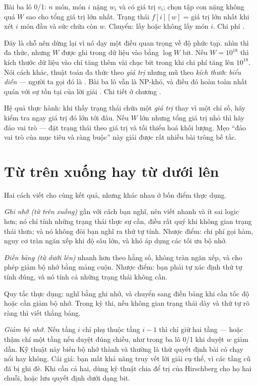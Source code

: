\documentclass[../../algorithm.tex]{subfiles}
\begin{document}
Bài ba lô 0/1: \(n\) món, món \(i\) nặng \(w_i\) và có giá trị \(v_i\); chọn tập con nặng không quá \(W\) sao cho tổng giá trị lớn nhất. Trạng thái \(f[i][w]\) = giá trị lớn nhất khi xét \(i\) món đầu và sức chứa còn \(w\). Chuyển: lấy hoặc không lấy món \(i\). Chi phí .

Đây là chỗ nên dừng lại vì nó dạy một điều quan trọng về độ phức tạp.  nhìn thì đa thức, nhưng \(W\) được ghi trong dữ liệu vào bằng \(\log W\) bit. Nếu \(W = 10^{18}\) thì kích thước dữ liệu vào chỉ tăng thêm vài chục bit trong khi chi phí tăng lên \(10^{18}\). Nói cách khác, thuật toán đa thức theo \emph{giá trị} nhưng mũ theo \emph{kích thước biểu diễn} --- người ta gọi đó là . Bài ba lô vẫn là NP-khó, và điều đó hoàn toàn nhất quán với sự tồn tại của lời giải . Chi tiết ở chương .

Hệ quả thực hành: khi thấy trạng thái chứa một \emph{giá trị} thay vì một chỉ số, hãy kiểm tra ngay giá trị đó lớn tới đâu. Nếu \(W\) lớn nhưng tổng giá trị nhỏ thì hãy đảo vai trò --- đặt trạng thái theo giá trị và tối thiểu hoá khối lượng. Mẹo ``đảo vai trò của mục tiêu và ràng buộc'' này giải được rất nhiều bài trông bế tắc.

\section{Từ trên xuống hay từ dưới lên}

Hai cách viết cho cùng kết quả, nhưng khác nhau ở bốn điểm thực dụng.

\emph{Ghi nhớ (từ trên xuống)} gần với cách bạn nghĩ, nên viết nhanh và ít sai logic hơn; nó chỉ tính những trạng thái thực sự cần, điều rất quý khi không gian trạng thái thưa; và nó không đòi bạn nghĩ ra thứ tự tính. Nhược điểm: chi phí gọi hàm, nguy cơ tràn ngăn xếp khi độ sâu lớn, và khó áp dụng các tối ưu bộ nhớ.

\emph{Điền bảng (từ dưới lên)} nhanh hơn theo hằng số, không tràn ngăn xếp, và cho phép giảm bộ nhớ bằng mảng cuộn. Nhược điểm: bạn phải tự xác định thứ tự tính đúng, và nó tính cả những trạng thái không cần.

Quy tắc thực dụng: nghĩ bằng ghi nhớ, và chuyển sang điền bảng khi cần tốc độ hoặc cần giảm bộ nhớ. Trong kỳ thi, nếu không gian trạng thái dày và thứ tự rõ ràng thì viết thẳng bảng.

\emph{Giảm bộ nhớ.} Nếu tầng \(i\) chỉ phụ thuộc tầng \(i-1\) thì chỉ giữ hai tầng --- hoặc thậm chí một tầng nếu duyệt đúng chiều, như trong ba lô 0/1 khi duyệt \(w\) giảm dần. Kỹ thuật này biến  bộ nhớ thành  và thường là thứ quyết định bài có chạy nổi hay không. Cái giá: bạn mất khả năng truy vết lời giải cụ thể, vì các tầng cũ đã bị ghi đè. Khi cần cả hai, dùng kỹ thuật chia để trị của Hirschberg cho họ hai chuỗi, hoặc lưu quyết định dưới dạng bit.
\end{document}
